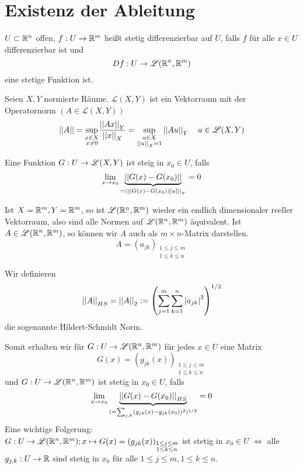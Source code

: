 \documentclass[../ana2.tex]{subfiles}
\begin{document}
\setcounter{section}{11}
\section{Existenz der Ableitung}
\begin{defi}
    \(U \subset \mathbb{R}^n \) offen, \(f:U\rightarrow \mathbb{R}^m\) heißt
    stetig differenzierbar auf \(U\), falls \(f\) für alle
    \(x \in U\) differenzierbar ist und    
    \[ Df:U\rightarrow \mathscr{L}(\mathbb{R}^n, \mathbb{R}^m) \]
    eine stetige Funktion ist.
\end{defi}
\begin{bem}
    Seien \(X, Y\) normierte Räume. 
    \( \mathscr{L}(X,Y) \) ist ein Vektorraum mit
    der Operatornorm \( (A \in \mathscr{L}(X,Y)) \)
    \[ \left|\left|A\right|\right| = \underset{\substack{x\in X\\x\neq 0}}{\sup}
    \frac{\left|\left|Ax\right|\right|_Y}{\left|\left|x\right|\right|_X} 
    = \underset{\substack{u\in X\\ \left|\left|u\right|\right|_X = 1}}{\sup}
    \left|\left|Au\right|\right|_Y
    \quad a \in \mathscr{L}(X,Y) \]
\end{bem}
\begin{bem}
    Eine Funktion \(G:U\rightarrow \mathscr{L}(X,Y)\) ist 
    steig in \(x_0 \in U\), falls 
    \[ \lim\limits_{x\rightarrow{}x_0} \underbrace{\left|\left|G(x) - G(x_0)\right|\right|}_{
        = \left|\left|(G(x) - G(x_0))[u]\right|\right|_Y
    } = 0 \]
\end{bem}
Ist \(X=\mathbb{R}^m, Y = \mathbb{R}^m\), so ist \(\mathscr{L}(\mathbb{R}^n, \mathbb{R}^m)\)
wieder ein endlich dimensionaler reeller Vektorraum, also sind 
alle Normen auf \( \mathscr{L}(\mathbb{R}^n, \mathbb{R}^m) \) äquivalent.
Ist \( A \in \mathscr{L}(\mathbb{R}^n, \mathbb{R}^m) \), so können wir \(A\) 
auch als \( m \times n \)-Matrix darstellen.
\[ A = (a_{jk})_{\substack{ 1 \leq j \leq m\\1 \leq k \leq n }} \]
\begin{defi*}
    Wir definieren
    \[ \left|\left|A\right|\right|_{HS} = \left|\left|A\right|\right|_2 := \left( 
        \sum_{j=1}^m \sum_{k=1}^n \left|a_{jk}\right|^2 \right)^{1/2} \]
    die sogenannte Hildert-Schmidt Norm.
\end{defi*}
Somit erhalten wir für \( G:U\rightarrow \mathscr{L}(\mathbb{R}^n, \mathbb{R}^m) \) 
für jedes \( x \in U \) eine Matrix
\[ G(x) = (g_{jk}(x))_{\substack{1 \leq j \leq m \\ 
1 \leq k \leq n}} \]
und \( G:U\rightarrow \mathscr{L}(\mathbb{R}^n, \mathbb{R}^m) \) ist stetig 
in \(x_0 \in U\), falls
\[ \lim\limits_{x\rightarrow{}x_0} \underbrace{\left|\left|G(x) - G(x_0)\right|\right|_{HS}}_{
    (= \sum_{j,k} (g_{jk}(x)-g_{jk}(x_0))^2)^{1/2}} = 0 \]
Eine wichtige Folgerung:\\
\( G:U\rightarrow \mathscr{L}(\mathbb{R}^n, \mathbb{R}^m); x \mapsto G(x) 
= (g_{jk}(x))_{\substack{1 \leq j \leq m 
\\ 1 \leq k \leq n}} \)
ist stetig in \( x_0 \in U \)
\( \Leftrightarrow \) alle \( g_{j,k}:U\rightarrow \mathbb{R} \) 
sind stetig in \(x_0\) für alle 
\( 1 \leq j \leq m, 1 \leq k \leq n \).\\
\end{document}
